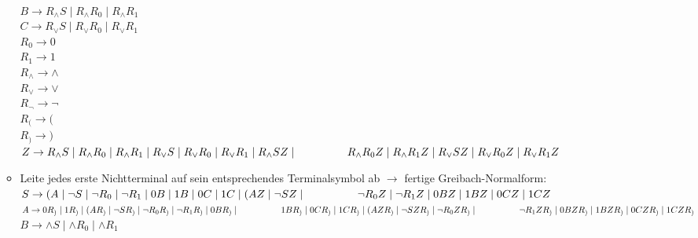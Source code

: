 \documentclass[11pt]{article}
\begin{document}
\begin{enumerate}
\begin{itemize}
\\\hspace*{6mm} $B \rightarrow R_{\wedge} S \mid R_{\wedge}R_{0} \mid R_{\wedge}R_{1}$
\\\hspace*{6mm} $C \rightarrow R_{\vee} S \mid R_{\vee}R_{0} \mid R_{\vee}R_{1}$
\\\hspace*{6mm} $R_{0} \rightarrow 0$
\\\hspace*{6mm} $R_{1} \rightarrow 1$
\\\hspace*{6mm} $R_{\wedge} \rightarrow \wedge$
\\\hspace*{6mm} $R_{\vee} \rightarrow \vee$
\\\hspace*{6mm} $R_{\neg} \rightarrow \neg$
\\\hspace*{6mm} $R_{(} \rightarrow ($
\\\hspace*{6mm} $R_{)} \rightarrow )$
\\\hspace*{6mm} $Z \rightarrow R_{\wedge} S \mid R_{\wedge}R_{0} \mid R_{\wedge}R_{1} \mid R_{\vee} S \mid R_{\vee}R_{0} \mid R_{\vee}R_{1} \mid R_{\wedge} SZ \mid \hspace*{16mm}R_{\wedge}R_{0}Z \mid R_{\wedge}R_{1}Z \mid R_{\vee} SZ \mid R_{\vee}R_{0}Z \mid R_{\vee}R_{1}Z$
\item Leite jedes erste Nichtterminal auf sein entsprechendes Terminalsymbol ab $\rightarrow$ fertige Greibach-Normalform:
\\\hspace*{6mm} $S \rightarrow (A\mid \neg S \mid \neg R_{0} \mid \neg R_{1} \mid 0B \mid 1B \mid 0 C \mid 1C \mid (AZ \mid \neg SZ \mid \hspace*{16,5mm} \neg R_{0}Z \mid \neg R_{1}Z \mid 0BZ \mid 1BZ \mid  0 CZ \mid 1 CZ$
\\\hspace*{6mm} $A \rightarrow 0R_{)}\mid 1R_{)}\mid (AR_{)}\mid \neg SR_{)} \mid \neg R_{0}R_{)} \mid \neg R_{1}R_{)} \mid 0BR_{)} \mid \hspace*{16,5mm} 1BR_{)} \mid 0 CR_{)} \mid 1CR_{)} \mid (AZR_{)} \mid \neg SZR_{)} \mid \neg R_{0}ZR_{)} \mid \hspace*{16,5mm}\neg R_{1}ZR_{)} \mid 0BZR_{)} \mid 1BZR_{)} \mid 0 CZR_{)} \mid 1CZR_{)}$
\\\hspace*{6mm} $B \rightarrow \wedge S \mid \wedge R_{0} \mid \wedge R_{1}$

\end{itemize}
\end{enumerate}
\end{document}
